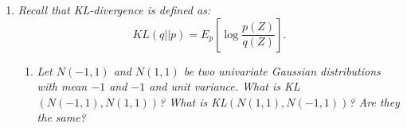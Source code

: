 \documentclass[12pt,oneside,reqno]{amsart}
\theoremstyle{plain}
\theoremstyle{definition}
\theoremstyle{remark}
\newcommand{\bb}{\vspace{3mm}}
\newcommand{\bee}{\begin{equation}\begin{aligned}}
\newcommand{\eee}{\end{aligned}\end{equation}}
\newcommand{\fracc}{\frac}
\begin{document}
\begin{enumerate}[label=\arabic*.]
\begin{enumerate}
\begin{proof}
Observe:
\bee
var(X) &= E((X - E(X))^2)\\
&= E(X^2 - 2XE(X) + E(X)^2)\\
&= E(X^2) - 2E(X)E(X) + E(X)^2\\
&= E(X^2) - E(X)^2.\\
\eee
Hence:
$$
E(X^2) = var(X) + E(X)^2.
$$
\end{proof}

\item \textit{Define the conditional variance $var(X|Y) = E((X - E(X|Y))^2|Y)$. Prove that $var(X) = E(var(X|Y)) + var(E(X|Y))$.  } 

\begin{proof}
Recall the law of total expectation:
$$
E(X) = E(E(X|Y)).
$$
Behold:
\bee
var(X) &= E(X^2) - E(X)^2\\
&= E(E(X^2|Y)) - E(E(X|Y))^2\\
&= E(var(X|Y) + E(X|Y)^2)  - E(E(X|Y))^2\\
&= E(var(X|Y)) + E(E(X|Y)^2))  - E(E(X|Y))^2\\
&= E(var(X|Y)) + var(E(X|Y)).
\eee
Note the second equality is by the law of total expectation, the third is by part (a), the fourth equality is by linearity of expectation, and the fifth is by the alternate definition of variance derived in part (a). 
\end{proof}
\end{enumerate}
\bb
\item \textit{Recall that KL-divergence is defined as:
$$
KL(q||p) = E_p\left[\log\fracc{p(Z)}{q(Z)} \right].
$$}
\begin{enumerate}
\item \textit{Let $N(-1,1)$ and $N(1,1)$ be two univariate Gaussian distributions with mean $-1$ and $-1$ and unit variance. What is KL$(N(-1,1),N(1,1))$? What is KL$(N(1,1),N(-1,1))$? Are they the same?}
\bb


\end{enumerate}
\end{enumerate}
\end{document}
